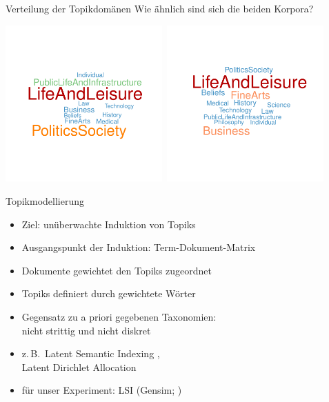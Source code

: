 \documentclass{beamer}
\begin{document}
\begin{frame}
  {Verteilung der Topikdomänen}
  Wie ähnlich sind sich die beiden Korpora?\\[1cm]
  \begin{center}
    \includegraphics[width=0.45\textwidth]{dereko}~\includegraphics[width=0.45\textwidth]{cow}
  \end{center}
\end{frame}

\begin{frame}
  {Topikmodellierung}
  \begin{itemize}
    \item Ziel: \alert{unüberwachte Induktion von Topiks}
    \item Ausgangspunkt der Induktion: Term-Dokument-Matrix
    \item Dokumente gewichtet den Topiks zugeordnet
    \item Topiks definiert durch gewichtete Wörter
    \item Gegensatz zu a priori gegebenen Taxonomien:\\
      nicht strittig und nicht diskret
      \pause
      \vspace{0.5cm}
    \item z.\,B.\ Latent Semantic Indexing \citep{LandauerDumais1994},\\
      Latent Dirichlet Allocation \citep{BleiEa2003}
      \vspace{0.5cm}
    \item für unser Experiment: LSI (Gensim; \citealp{RehurekSojka2010})
  \end{itemize}
\end{frame}
\end{document}
